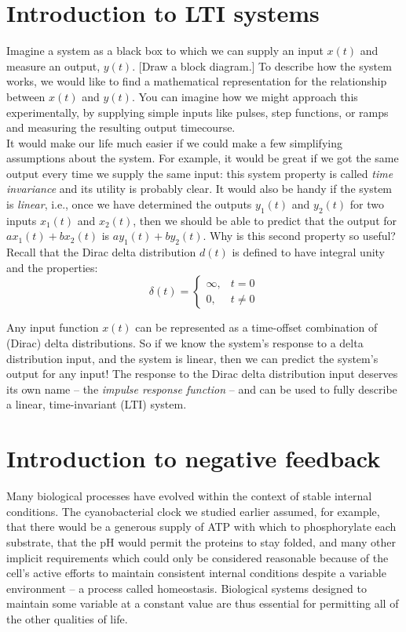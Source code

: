 \documentclass{article}
\begin{document}
\large

\section*{Introduction to LTI systems}

Imagine a system as a black box to which we can supply an input $x(t)$ and measure an output, $y(t)$. [Draw a block diagram.] To describe how the system works, we would like to find a mathematical representation for the relationship between $x(t)$ and $y(t)$. You can imagine how we might approach this experimentally, by supplying simple inputs like pulses, step functions, or ramps and measuring the resulting output timecourse. \\

It would make our life much easier if we could make a few simplifying assumptions about the system. For example, it would be great if we got the same output every time we supply the same input: this system property is called \textit{time invariance} and its utility is probably clear. It would also be handy if the system is \textit{linear}, i.e., once we have determined the outputs $y_1(t)$ and $y_2(t)$ for two inputs $x_1(t)$ and $x_2(t)$, then we should be able to predict that the output for $ax_1(t) + bx_2(t)$ is  $ay_1(t) + by_2(t)$. Why is this second property so useful?\\

Recall that the Dirac delta distribution $d(t)$ is defined to have integral unity and the properties:
\[ \delta(t)=\begin{cases}
    \infty, & t = 0\\
    0, & t \neq 0
  \end{cases} \]
  
Any input function $x(t)$ can be represented as a time-offset combination of (Dirac) delta distributions. So if we know the system's response to a delta distribution input, and the system is linear, then we can predict the system's output for any input! The response to the Dirac delta distribution input deserves its own name -- the \textit{impulse response function} -- and can be used to fully describe a linear, time-invariant (LTI) system.

\section*{Introduction to negative feedback}

Many biological processes have evolved within the context of stable internal conditions. The cyanobacterial clock we studied earlier assumed, for example, that there would be a generous supply of ATP with which to phosphorylate each substrate, that the pH would permit the proteins to stay folded, and many other implicit requirements which could only be considered reasonable because of the cell's active efforts to maintain consistent internal conditions despite a variable environment -- a process called homeostasis. Biological systems designed to maintain some variable at a constant value are thus essential for permitting all of the other qualities of life.\\
\end{document}
